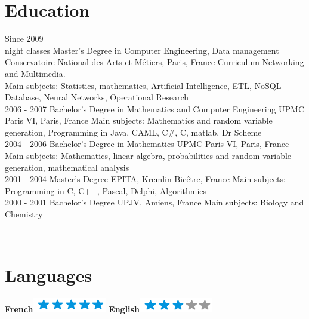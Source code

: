 \documentclass[]{bankcy}
\begin{document}
\section{Education}
\begin{entrylist}
  \entry
    {Since 2009\\ night classes}
    {Master's Degree in Computer Engineering, Data management}
    {Conservatoire National des Arts et Métiers, Paris, France}
    {Curriculum Networking and Multimedia.\\
    Main subjects: Statistics, mathematics, Artificial Intelligence, ETL, NoSQL Database, Neural Networks, Operational Research\\}
  \entry
    {2006 - 2007}
    {Bachelor's Degree in Mathematics and Computer Engineering}
    {UPMC Paris VI, Paris, France}
    {Main subjects: Mathematics and random variable generation, Programming in Java, CAML, C\#, C, matlab, Dr Scheme\\}
  \entry
    {2004 - 2006}
    {Bachelor's Degree in Mathematics}
    {UPMC Paris VI, Paris, France}
    {Main subjects: Mathematics, linear algebra, probabilities and random variable generation, mathematical analysis\\}
  \entry
    {2001 - 2004}
    {Master's Degree}
    {EPITA, Kremlin Bicêtre, France}
    {Main subjects: Programming in C, C++, Pascal, Delphi, Algorithmics\\}
  \entry
    {2000 - 2001}
    {Bachelor's Degree}
    {UPJV, Amiens, France}
    {Main subjects: Biology and Chemistry\\}
\end{entrylist}
\begin{aside}
~
~
~ 
~
\section{Languages}
    \textbf{French}\includegraphics[scale=0.40]{img/5stars.png}
    \textbf{English}\includegraphics[scale=0.40]{img/3stars.png}
\end{aside}
\newpage
\end{document}
